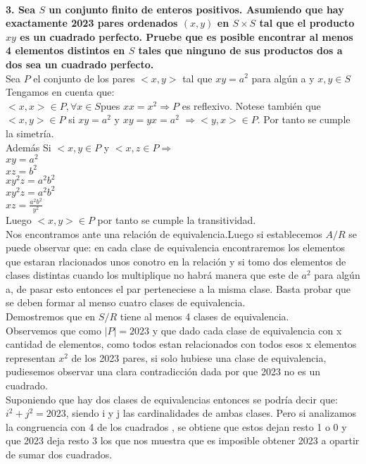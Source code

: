 \documentclass[12pt,a4paper]{article}
\begin{document}
\\\textbf{3. Sea $S$ un conjunto finito de enteros positivos. Asumiendo que hay exactamente 2023 pares ordenados $(x,y)$ en $S\times S$ tal que el producto $xy$ es un cuadrado perfecto. Pruebe que es posible encontrar al menos 4 elementos distintos en $S$ tales que ninguno de sus productos dos a dos sea un cuadrado perfecto.}\\
Sea $P$ el conjunto de los pares $<x,y>$ tal que $xy=a^{2}$ para alg\'un a y $x,y \in S$
\\Tengamos en cuenta que:\\
 $<x,x> \in P, \forall x \in S $pues $xx=x^{2} \Rightarrow P $ es reflexivo.
 Notese tambi\'en que $<x,y> \in P$ si $xy=a^{2}$ y $xy=yx=a^{2}$ $\Rightarrow <y,x> \in P $. Por tanto se cumple la simetr\'ia.\\
Adem\'as Si $<x,y \in P$ y $<x,z \in P \Rightarrow$\\
$xy=a^{2}$\\
$xz=b^{2}$\\
$xy^{2}z=a^{2}b^{2}$\\
$xy^{2}z=a^{2}b^{2}$\\
$xz=\frac{a^{2}b^{2}}{y^{2}}$\\
Luego $<x,y> \in P$ por tanto se cumple la transitividad.\\
Nos encontramos ante una relaci\'on de equivalencia.Luego si establecemos $A/R$ se puede observar que: en cada clase de equivalencia encontraremos los elementos que estaran rlacionados unos conotro en la relaci\'on y si tomo dos elementos de clases distintas cuando los multiplique no habr\'a manera que este de $a^{2}$ para alg\'un a, de pasar esto entonces el par perteneciese a la misma clase. Basta probar que se deben formar al menso cuatro clases de equivalencia.\\
Demostremos que en $S/R$ tiene al menos 4 clases de equivalencia.\\
Observemos que como $|P|=2023$ y que dado cada clase de equivalencia con x cantidad de elementos, como todos estan relacionados con todos esos x elementos representan $x^{2}$ de los 2023 pares, si solo hubiese una clase de equivalencia, pudiesemos observar una clara contradicci\'on dada por que 2023 no es un cuadrado.\\
Suponiendo que hay dos clases de equivalencias entonces se podr\'ia decir que: $i^{2}+j^{2}=2023$, siendo i y j las cardinalidades de ambas clases. Pero si analizamos la congruencia con 4 de los cuadrados , se obtiene que estos dejan resto 1 o 0 y que 2023 deja resto 3 los que nos muestra que es imposible obtener 2023 a opartir de sumar dos cuadrados.\\
\end{document}
